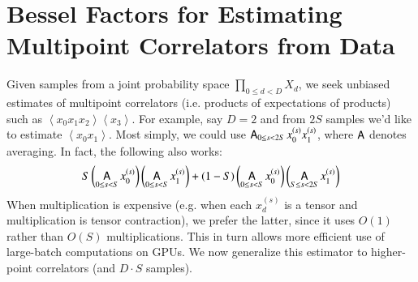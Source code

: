 \documentclass{article}
\newcommand{\wrap}[1]{\left(#1\right)}
\newcommand{\wang}[1]{\left\langle#1\right\rangle}
\DeclareMathOperator*{\Avg}{\text{\sffamily A}}
\begin{document}
\section{Bessel Factors for Estimating Multipoint Correlators from Data}\label{sect:bessel}

    Given samples from a joint probability space $\prod_{0\leq d<D} X_d$, we
    seek unbiased estimates of multipoint correlators (i.e. products of
    expectations of products) such as $\wang{x_0 x_1 x_2}\wang{x_3}$.  For
    example, say $D=2$ and from $2S$ samples we'd like to estimate $\wang{x_0
    x_1}$.  Most simply, we could use $\Avg_{0\leq s<2S} x_0^{(s)} x_1^{(s)}$,
    where $\Avg$ denotes averaging.  In fact, the following also works:
    \begin{equation} \label{eq:bessel}
        S
        \wrap{\Avg_{0\leq s< S} x_0^{(s)}}
        \wrap{\Avg_{0\leq s< S} x_1^{(s)}}
        +
        (1-S)
        \wrap{\Avg_{0\leq s< S} x_0^{(s)}}
        \wrap{\Avg_{S\leq s<2S} x_1^{(s)}}
    \end{equation}
    When multiplication is expensive (e.g. when each $x_d^{(s)}$ is a tensor
    and multiplication is tensor contraction), we prefer the latter, since it
    uses $O(1)$ rather than $O(S)$ multiplications.  This in turn allows more
    efficient use of large-batch computations on GPUs.  We now generalize this
    estimator to higher-point correlators (and $D\cdot S$ samples).
\end{document}
